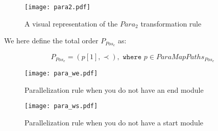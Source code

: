 \begin{figure}[H]
	\centering
	\texttt{[image: para2.pdf]}
	\caption{A visual representation of the $Para_2$ transformation rule}
	\label{fig:para2}
\end{figure}

We here define the total order $P_{Pos_e}$ as:

\[P_{Pos_e} = (p[1], \prec), \texttt{ where } p \in ParaMapPaths_{Pos_e} \]


\begin{figure}[h]
\centering
\texttt{[image: para\_we.pdf]}
\caption{Parallelization rule when you do not have an end module}
\label{fig:para_we}
\end{figure}

\begin{figure}[h]
\centering
\texttt{[image: para\_ws.pdf]}
\caption{Parallelization rule when you do not have a start module}
\label{fig:para_ws}
\end{figure}

